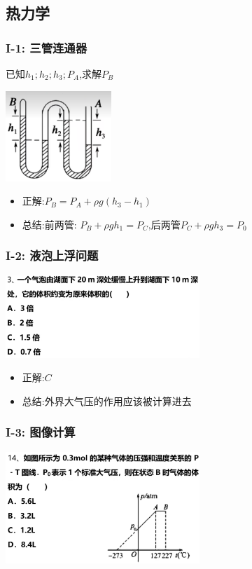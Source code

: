 \documentclass{article}
\begin{document}
\subsection{热力学}
\subsubsection{I-1: 三管连通器}
已知$h_{1};h_{2};h_{3};P_{A}$,求解$P_{B}$

\includegraphics[width = 0.3\textwidth,keepaspectratio]{./pictures/2.3-1.png}
\begin{itemize}
    \item 正解:\quad $P_{B} = P_{A} + \rho g (h_{3} - h_{1}) $
    \item 总结:\quad 前两管: $ P_{B} + \rho g h_{1} = P_{C}\text{,后两管} P_{C} + \rho g h_{3} = P_{0}$

\end{itemize}

\vspace{2em}

\subsubsection{I-2: 液泡上浮问题}
\includegraphics[width = 0.55\textwidth,keepaspectratio]{./pictures/2.3-2.png}

\begin{itemize}
    \item 正解:\quad $C$
    \item 总结:\quad 外界大气压的作用应该被计算进去
\end{itemize}

\vspace{2em}

\subsubsection{I-3: 图像计算}
\includegraphics[width = 0.55\textwidth,keepaspectratio]{./pictures/2.3-3.png}
\end{document}
